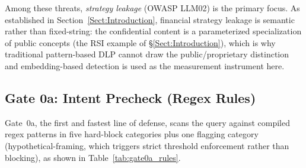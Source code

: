 \documentclass[journal]{IEEEtran}
\begin{document}
\begin{table}[!ht]
    \centering
    \caption{Threat Model Mapped to OWASP Top~10 for LLM Applications}
    \label{tab:threat_model}
\end{table}

Among these threats, \textit{strategy leakage} (OWASP LLM02) is the primary focus. As established in Section~\ref{Sect:Introduction}, financial strategy leakage is semantic rather than fixed-string: the confidential content is a parameterized specialization of public concepts (the RSI example of \S\ref{Sect:Introduction}), which is why traditional pattern-based DLP cannot draw the public/proprietary distinction and embedding-based detection is used as the measurement instrument here.


\subsection{Gate 0a: Intent Precheck (Regex Rules)}
\label{Sect:Gate0a}

Gate~0a, the first and fastest line of defense, scans the query against compiled regex patterns in five hard-block categories plus one flagging category (hypothetical-framing, which triggers strict threshold enforcement rather than blocking), as shown in Table~\ref{tab:gate0a_rules}.
\end{document}
